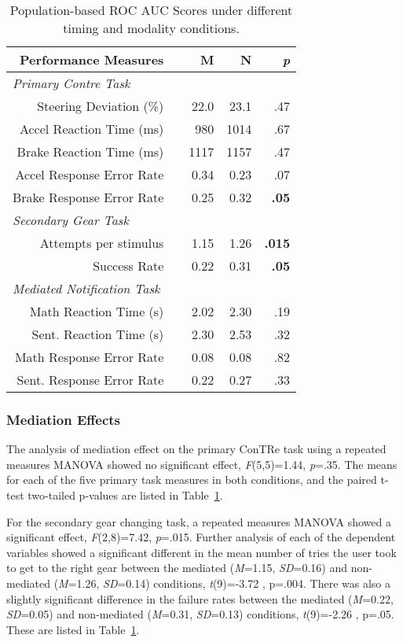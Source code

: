 \begin{table}
\centering
\begin{tabular}{@{}rcrrr@{}}\toprule
Performance Measures & \phantom{a} & M & N & \textit{p}\\
 \midrule
\multicolumn{1}{l}{\textit{Primary Contre Task \phantom{abcabcabc}}} \\
 Steering Deviation (\%)      && 22.0 & 23.1 & .47 \\
 Accel Reaction Time (ms)     && 980  & 1014 & .67 \\
 Brake Reaction Time (ms)     && 1117 & 1157 & .47 \\
 Accel Response Error Rate    && 0.34 & 0.23 & .07 \\
 Brake Response Error Rate    && 0.25 & 0.32 & \textbf{.05} \\
  \midrule
\multicolumn{1}{l}{\textit{Secondary Gear Task }} \\
 Attempts per stimulus        && 1.15 & 1.26 & \textbf{.015} \\
 Success Rate                 && 0.22 & 0.31 & \textbf{.05} \\
 \midrule
\multicolumn{1}{l}{\textit{Mediated Notification Task}} \\
 Math Reaction Time (s)       && 2.02 & 2.30 & .19 \\
 Sent. Reaction Time (s)      && 2.30 & 2.53 & .32 \\
 Math Response Error Rate     && 0.08 & 0.08 & .82 \\
 Sent. Response Error Rate    && 0.22 & 0.27 & .33 \\
 \bottomrule
\end{tabular}
\caption{Population-based ROC AUC Scores under different timing and modality conditions.}
\label{Tab:T123}
\end{table}

\subsubsection{Mediation Effects}
The analysis of mediation effect on the primary ConTRe task using a repeated measures MANOVA showed no significant effect, \textit{F}(5,5)=1.44, \textit{p}=.35. The means for each of the five primary task measures in both conditions, and the paired t-test two-tailed p-values are listed in Table~\ref{Tab:T123}.

For the secondary gear changing task, a repeated measures MANOVA showed a significant effect, \textit{F}(2,8)=7.42, \textit{p}=.015. Further analysis of each of the dependent variables showed a significant different in the mean number of tries the user took to get to the right gear between the mediated (\textit{M}=1.15, \textit{SD}=0.16) and non-mediated (\textit{M}=1.26, \textit{SD}=0.14) conditions, \textit{t}(9)=-3.72 , p=.004. There was also a slightly significant difference in the failure rates between the mediated (\textit{M}=0.22, \textit{SD}=0.05) and non-mediated (\textit{M}=0.31, \textit{SD}=0.13) conditions, \textit{t}(9)=-2.26 , p=.05. These are listed in Table~\ref{Tab:T123}.

